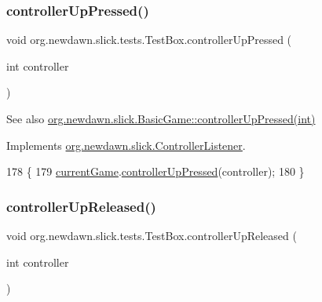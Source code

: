 \subsubsection{\texorpdfstring{controller\+Up\+Pressed()}{controllerUpPressed()}}
{\footnotesize\ttfamily void org.\+newdawn.\+slick.\+tests.\+Test\+Box.\+controller\+Up\+Pressed (\begin{DoxyParamCaption}\item[{int}]{controller }\end{DoxyParamCaption})\hspace{0.3cm}{\ttfamily [inline]}}

\begin{DoxySeeAlso}{See also}
\mbox{\hyperlink{classorg_1_1newdawn_1_1slick_1_1_basic_game_a56128159ddf4514b79fe5fda77d4e97b}{org.\+newdawn.\+slick.\+Basic\+Game\+::controller\+Up\+Pressed(int)}} 
\end{DoxySeeAlso}


Implements \mbox{\hyperlink{interfaceorg_1_1newdawn_1_1slick_1_1_controller_listener_a7cb917761de1e555b23469042b6f1e03}{org.\+newdawn.\+slick.\+Controller\+Listener}}.


\begin{DoxyCode}
178                                                     \{
179         \mbox{\hyperlink{classorg_1_1newdawn_1_1slick_1_1tests_1_1_test_box_a5e0fdb2f97173d828af597044c525078}{currentGame}}.\mbox{\hyperlink{classorg_1_1newdawn_1_1slick_1_1_basic_game_a56128159ddf4514b79fe5fda77d4e97b}{controllerUpPressed}}(controller);
180     \}
\end{DoxyCode}
\mbox{\label{classorg_1_1newdawn_1_1slick_1_1tests_1_1_test_box_ad22f577d725eaa52a02136efa4ca5f95}} 
\subsubsection{\texorpdfstring{controller\+Up\+Released()}{controllerUpReleased()}}
{\footnotesize\ttfamily void org.\+newdawn.\+slick.\+tests.\+Test\+Box.\+controller\+Up\+Released (\begin{DoxyParamCaption}\item[{int}]{controller }\end{DoxyParamCaption})\hspace{0.3cm}{\ttfamily [inline]}}

